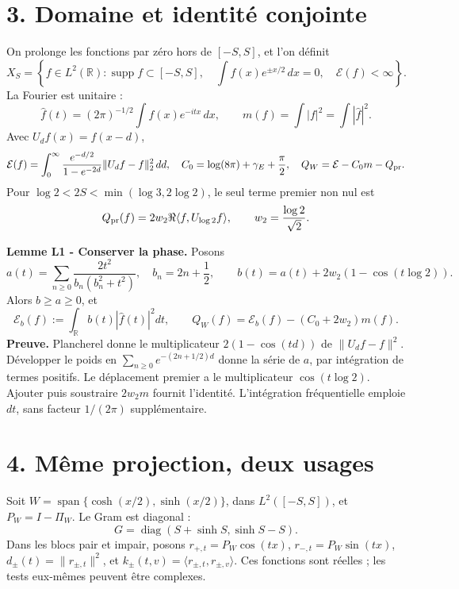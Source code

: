 \documentclass[
  10pt,
  a4paper,
]{article}
\begin{document}
\hypertarget{domaine-et-identituxe9-conjointe}{%
\section{3. Domaine et identité
conjointe}\label{domaine-et-identituxe9-conjointe}}

On prolonge les fonctions par zéro hors de \([-S,S]\), et l'on définit
\[
X_S=\left\{f\in L^2(\mathbb R):\operatorname{supp}f\subset[-S,S],\quad
\int f(x)e^{\pm x/2}\,dx=0,\quad\mathcal E(f)<\infty\right\}.
\] La Fourier est unitaire : \[
\widehat f(t)=(2\pi)^{-1/2}\int f(x)e^{-itx}\,dx,
\qquad m(f)=\int|f|^2=\int|\widehat f|^2.
\] Avec \(U_df(x)=f(x-d)\), \[
\mathcal E(f)=\int_0^\infty
\frac{e^{-d/2}}{1-e^{-2d}}\|U_df-f\|_2^2\,dd,
\quad C_0=\log(8\pi)+\gamma_E+\frac\pi2,
\quad Q_W=\mathcal E-C_0m-Q_{\rm pr}.
\] Pour \(\log2<2S<\min(\log3,2\log2)\), le seul terme premier non nul
est \[
Q_{\rm pr}(f)=2w_2\Re\langle f,U_{\log2}f\rangle,
\qquad w_2=\frac{\log2}{\sqrt2}.
\]

\textbf{Lemme L1 - Conserver la phase.} Posons \[
a(t)=\sum_{n\ge0}\frac{2t^2}{b_n(b_n^2+t^2)},\quad b_n=2n+\frac12,
\qquad b(t)=a(t)+2w_2(1-\cos(t\log2)).
\] Alors \(b\ge a\ge0\), et \[
\mathcal E_b(f):=\int_{\mathbb R}b(t)|\widehat f(t)|^2dt,
\qquad Q_W(f)=\mathcal E_b(f)-(C_0+2w_2)m(f).
\] \textbf{Preuve.} Plancherel donne le multiplicateur \(2(1-\cos(td))\)
de \(\|U_df-f\|^2\). Développer le poids en
\(\sum_{n\ge0}e^{-(2n+1/2)d}\) donne la série de \(a\), par intégration
de termes positifs. Le déplacement premier a le multiplicateur
\(\cos(t\log2)\). Ajouter puis soustraire \(2w_2m\) fournit l'identité.
L'intégration fréquentielle emploie \(dt\), sans facteur \(1/(2\pi)\)
supplémentaire.

\hypertarget{muxeame-projection-deux-usages}{%
\section{4. Même projection, deux
usages}\label{muxeame-projection-deux-usages}}

Soit \(W=\operatorname{span}\{\cosh(x/2),\sinh(x/2)\}\), dans
\(L^2([-S,S])\), et \(P_W=I-\Pi_W\). Le Gram est diagonal : \[
G=\operatorname{diag}(S+\sinh S,\sinh S-S).
\] Dans les blocs pair et impair, posons \(r_{+,t}=P_W\cos(tx)\),
\(r_{-,t}=P_W\sin(tx)\), \(d_\pm(t)=\|r_{\pm,t}\|^2\), et
\(k_\pm(t,v)=\langle r_{\pm,t},r_{\pm,v}\rangle\). Ces fonctions sont
réelles ; les tests eux-mêmes peuvent être complexes.
\end{document}
